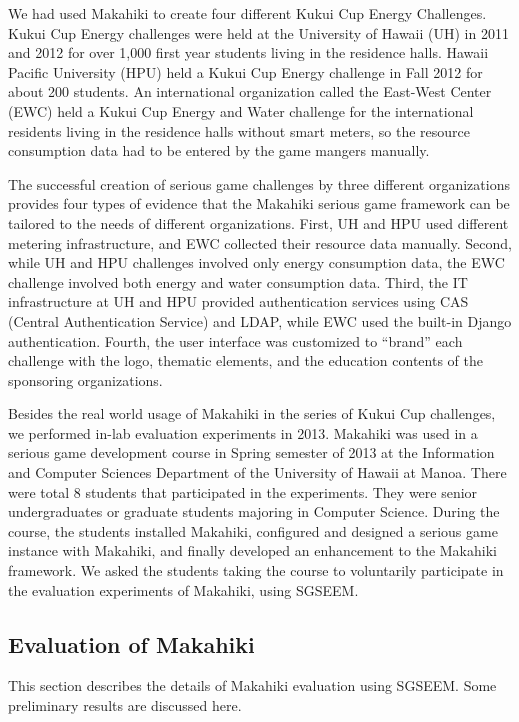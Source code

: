 \documentclass{sigchi}
\begin{document}
We had used Makahiki to create four different Kukui
Cup Energy Challenges. Kukui Cup Energy challenges were held at the
University of Hawaii (UH) in 2011 and 2012 for over 1,000 first
year students living in the residence halls. Hawaii Pacific University
(HPU) held a Kukui Cup Energy challenge in Fall 2012 for about 200
students. An international organization called the East-West Center
(EWC) held a Kukui Cup Energy and Water challenge for the
international residents living in the residence halls without smart
meters, so the resource consumption data had to be entered by the game
mangers manually.

The successful creation of serious game challenges by three different organizations
provides four types of evidence that the Makahiki serious game framework can be tailored
to the needs of different organizations. First, UH and HPU used different metering
infrastructure, and EWC collected their resource data manually.  Second, while UH and HPU
challenges involved only energy consumption data, the EWC challenge involved both energy
and water consumption data. Third, the IT infrastructure at UH and HPU provided
authentication services using CAS (Central Authentication Service) and LDAP, while EWC
used the built-in Django authentication.  Fourth, the user interface was customized to
``brand'' each challenge with the logo, thematic elements, and the education contents of
the sponsoring organizations.

Besides the real world usage of Makahiki in the series of Kukui Cup challenges, we
performed in-lab evaluation experiments in 2013. Makahiki was used in a serious game development
course in Spring semester of 2013 at the Information and Computer Sciences Department of the
University of Hawaii at Manoa. There were total 8 students that participated in the experiments.
They were senior undergraduates or graduate students majoring in Computer Science. During the
course, the students installed Makahiki, configured and designed a serious game instance with
Makahiki, and finally developed an enhancement to the Makahiki framework. We asked the students
taking the course to voluntarily participate in the evaluation experiments of Makahiki, using
SGSEEM.

\subsection{Evaluation of Makahiki}

This section describes the details of Makahiki evaluation using SGSEEM. Some preliminary results are discussed here.
\end{document}
